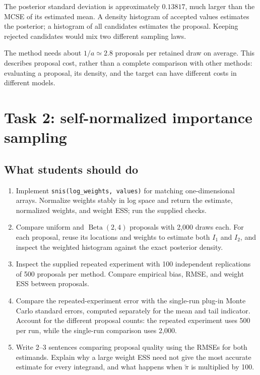 \documentclass[11pt,a4paper]{article}
\begin{document}
The posterior standard deviation is approximately $0.13817$, much larger
than the MCSE of its estimated mean. A density histogram of accepted values
estimates the posterior; a histogram of all candidates estimates the proposal.
Keeping rejected candidates would mix two different sampling laws.

The method needs about $1/a\simeq2.8$ proposals per retained draw on average.
This describes proposal cost, rather than a complete comparison with other
methods: evaluating a proposal, its density, and the target can have different
costs in different models.

\section{Task 2: self-normalized importance sampling}
\subsection{What students should do}
\begin{enumerate}
\item Implement \texttt{snis(log\_weights, values)} for matching
one-dimensional arrays. Normalize weights stably in log space and return
the estimate, normalized weights, and weight ESS; run the supplied checks.
\item Compare uniform and $\operatorname{Beta}(2,4)$ proposals with
2,000 draws each. For each proposal, reuse its locations and weights to
estimate both $I_1$ and $I_2$, and inspect the weighted histogram against the
exact posterior density.
\item Inspect the supplied repeated experiment with 100 independent
replications of 500 proposals per method. Compare empirical bias, RMSE,
and weight ESS between proposals.
\item Compare the repeated-experiment error with the single-run plug-in
Monte Carlo standard errors, computed separately for the mean and tail
indicator. Account for the different proposal counts: the repeated experiment
uses 500 per run, while the single-run comparison uses 2,000.
\item Write 2--3 sentences comparing proposal quality using the RMSEs for
both estimands. Explain why a large weight ESS need not give the most
accurate estimate for every integrand, and what happens when
$\widetilde\pi$ is multiplied by 100.
\end{enumerate}
\end{document}
